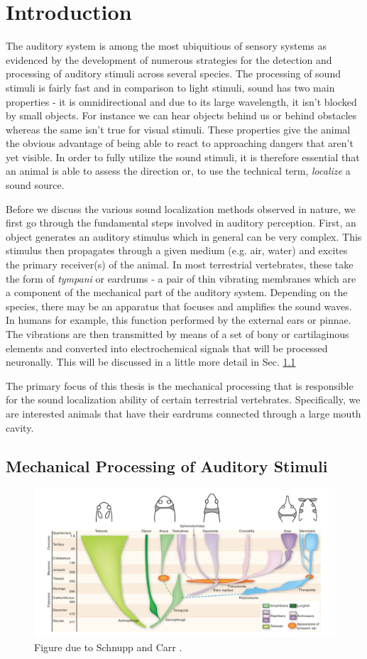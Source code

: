 \chapter{Introduction}\label{introchapter}
The auditory system is among the most ubiquitious of sensory systems as evidenced by the 
development of numerous strategies for the detection and processing of auditory stimuli
across several species. The processing of sound stimuli is fairly fast and in comparison
to light stimuli, sound has two main properties - it is omnidirectional and due to
its large wavelength, it isn't blocked by small objects. For instance we can hear objects
behind us or behind obstacles whereas the same isn't true for visual stimuli. These properties 
give the animal the obvious advantage of being able to react to approaching dangers that
aren't yet visible. In order to fully utilize the sound stimuli, it is therefore essential
that an animal is able to assess the direction or, to use the technical term, \textit{localize} a sound source.

Before we discuss the various sound localization methods observed in nature, we first
go through the fundamental steps involved in auditory perception. First, an object generates
an auditory stimulus which in general can be very complex. This stimulus then propagates
through a given medium (e.g. air, water) and excites the primary receiver(s) of the animal. In most
terrestrial vertebrates, these take the form of \textit{tympani} or eardrums - a pair of thin vibrating
membranes which are a component of the mechanical part of the auditory system.
Depending on the species, there may be an apparatus that focuses and amplifies the sound waves. In
humans for example, this function performed by the external ears or pinnae. 
The vibrations are then transmitted by means of a set of bony or cartilaginous elements and
converted into electrochemical signals that will be processed neuronally. This will be discussed
in a little more detail in Sec. \ref{mechanicalprocessing}

The primary focus of this thesis is the mechanical processing that is responsible for the
sound localization ability of certain terrestrial vertebrates. Specifically, we are interested
animals that have their eardrums connected through a large mouth cavity.

\section{Mechanical Processing of Auditory Stimuli}\label{mechanicalprocessing}

\begin{figure}
 \includegraphics[width=1.0\linewidth]{Diagrams/vertebrateearevolution.png}
 \caption[Vertebrate Ear Evolution]{Figure due to Schnupp and Carr \cite{schnuppcarr}.}
 \label{vertebrateearevolution}
\end{figure}